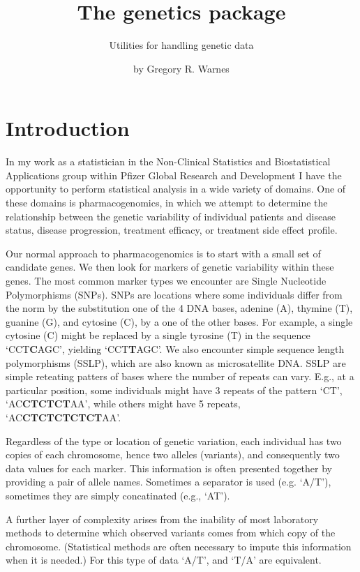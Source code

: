 \documentclass{report}
\begin{document}
\author{by Gregory R. Warnes}
\title{The genetics package}
\subtitle{Utilities for handling genetic data}

\maketitle

\section{Introduction}

In my work as a statistician in the Non-Clinical Statistics and
Biostatistical Applications group within Pfizer Global Research and
Development I have the opportunity to perform statistical analysis in
a wide variety of domains.  One of these domains is pharmacogenomics, in
which we attempt to determine the relationship between the genetic
variability of individual patients and disease status, disease
progression, treatment efficacy, or treatment side effect profile.

Our normal approach to pharmacogenomics is to start with a small set
of candidate genes.  We then look for markers of genetic variability
within these genes.  The most common marker types we encounter are
Single Nucleotide Polymorphisms (SNPs).  SNPs are locations where some
individuals differ from the norm by the substitution one of the 4 DNA
bases, adenine (A), thymine (T), guanine (G), and cytosine (C), by a
one of the other bases.  For example, a single cytosine (C) might be
replaced by a single tyrosine (T) in the sequence `CCT\textbf{C}AGC',
yielding `CCT\textbf{T}AGC'.  We also encounter simple sequence length
polymorphisms (SSLP), which are also known as microsatellite DNA.
SSLP are simple reteating patters of bases where the number of repeats
can vary. E.g., at a particular position, some individuals might have
3 repeats of the pattern `CT', `AC\textbf{CTCTCT}AA', while others
might have 5 repeats, `AC\textbf{CTCTCTCTCT}AA'.

Regardless of the type or location of genetic variation, each
individual has two copies of each chromosome, hence two alleles
(variants), and consequently two data values for each marker.  This
information is often presented together by providing a pair of allele
names.  Sometimes a separator is used (e.g.  `A/T'), sometimes they
are simply concatinated (e.g., `AT').

A further layer of complexity arises from the inability of most
laboratory methods to determine which observed variants comes from
which copy of the chromosome.  (Statistical methods are often
necessary to impute this information when it is needed.)  For this
type of data `A/T', and `T/A' are equivalent.
\end{document}
